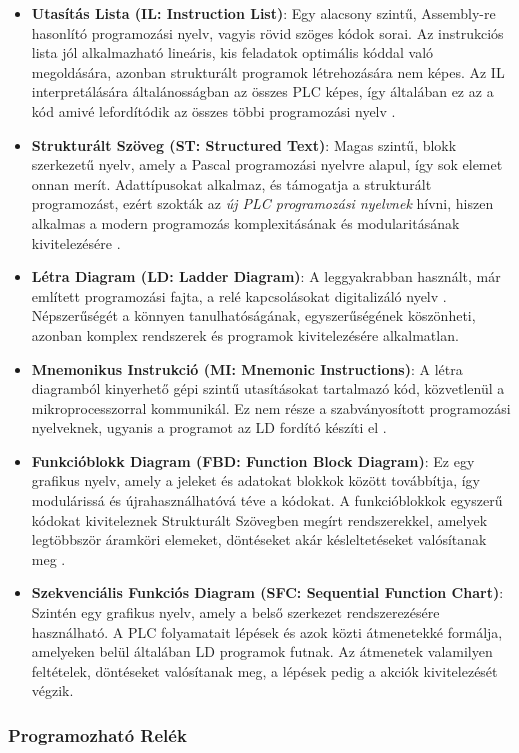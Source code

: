 \begin{itemize}
	\item \textbf{Utasítás Lista (IL: Instruction List)}: Egy alacsony szintű, Assembly-re hasonlító programozási nyelv, vagyis rövid szöges kódok sorai. Az instrukciós lista jól alkalmazható lineáris, kis feladatok optimális kóddal való megoldására, azonban strukturált programok létrehozására nem képes. Az IL interpretálására általánosságban az összes PLC képes, így általában ez az a kód amivé lefordítódik az összes többi programozási nyelv \cite{Baresi1998}.
	\item \textbf{Strukturált Szöveg (ST: Structured Text)}: Magas szintű, blokk szerkezetű nyelv, amely a Pascal programozási nyelvre alapul, így sok elemet onnan merít. Adattípusokat alkalmaz, és támogatja a strukturált programozást, ezért szokták az \textit{új PLC programozási nyelvnek} hívni, hiszen alkalmas a modern programozás komplexitásának és modularitásának kivitelezésére \cite{Baresi1998}.
	\item \textbf{Létra Diagram (LD: Ladder Diagram)}: A leggyakrabban használt, már említett programozási fajta, a relé kapcsolásokat digitalizáló nyelv \cite{Dey2020}. Népszerűségét a könnyen tanulhatóságának, egyszerűségének köszönheti, azonban komplex rendszerek és programok kivitelezésére alkalmatlan.
	\item \textbf{Mnemonikus Instrukció (MI: Mnemonic Instructions)}: A létra diagramból kinyerhető gépi szintű utasításokat tartalmazó kód, közvetlenül a mikroprocesszorral kommunikál. Ez nem része a szabványosított programozási nyelveknek, ugyanis a programot az LD fordító készíti el \cite{Dey2020}.
	\item \textbf{Funkcióblokk Diagram (FBD: Function Block Diagram)}: Ez egy grafikus nyelv, amely a jeleket és adatokat blokkok között továbbítja, így modulárissá és újrahasználhatóvá téve a kódokat. A funkcióblokkok egyszerű kódokat kiviteleznek Strukturált Szövegben megírt rendszerekkel, amelyek legtöbbször áramköri elemeket, döntéseket akár késleltetéseket valósítanak meg \cite{Baresi1998}.
	\item \textbf{Szekvenciális Funkciós Diagram (SFC: Sequential Function Chart)}: Szintén egy grafikus nyelv, amely a belső szerkezet rendszerezésére használható. A PLC folyamatait lépések és azok közti átmenetekké formálja, amelyeken belül általában LD programok futnak. Az átmenetek valamilyen feltételek, döntéseket valósítanak meg, a lépések pedig a akciók kivitelezését végzik.
\end{itemize}
\subsubsection{Programozható Relék}

